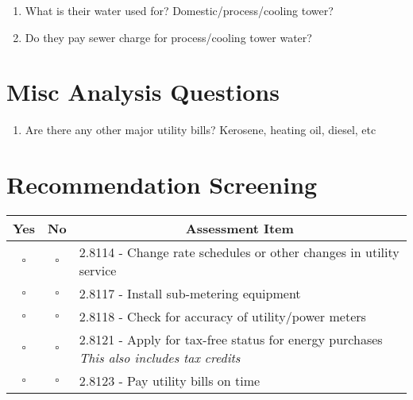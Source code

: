 \documentclass[./main.tex]{subfiles}
\begin{document}
\begin{enumerate}[leftmargin=*]
\item What is their water used for? Domestic/process/cooling tower?

\vspace{\answerspace}

\item Do they pay sewer charge for process/cooling tower water? 

\vspace{\answerspace}

\end{enumerate}

\section*{Misc Analysis Questions}

\begin{enumerate}[leftmargin=*]
\item Are there any other major utility bills? Kerosene, heating oil, diesel, etc

\vspace{\answerspace}

\end{enumerate}


\section*{Recommendation Screening}
\begin{tabular}{|c|c|p{13.5cm}|}
\hline
\multicolumn{1}{|c|}{\textbf{Yes}} & \multicolumn{1}{c|}{\textbf{No}} & \multicolumn{1}{c|}{\textbf{Assessment Item}} \\
\hline
$\square$ & $\square$ & 2.8114 - Change rate schedules or other changes in utility service \\ \hline
$\square$ & $\square$ & 2.8117 - Install sub-metering equipment \\ \hline
$\square$ & $\square$ & 2.8118 - Check for accuracy of utility/power meters \\ \hline
$\square$ & $\square$ & 2.8121 - Apply for tax-free status for energy purchases \emph{This also includes tax credits} \\ \hline
$\square$ & $\square$ & 2.8123 - Pay utility bills on time \\ \hline
\end{tabular}




\end{document}
